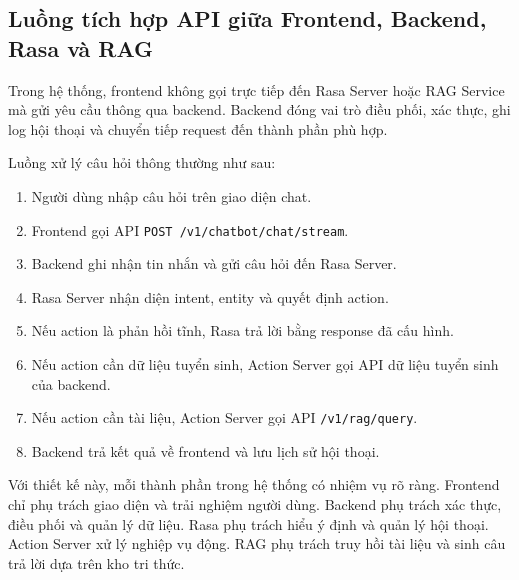 \subsection{Luồng tích hợp API giữa Frontend, Backend, Rasa và RAG}

Trong hệ thống, frontend không gọi trực tiếp đến Rasa Server hoặc RAG Service mà gửi yêu cầu thông qua backend. Backend đóng vai trò điều phối, xác thực, ghi log hội thoại và chuyển tiếp request đến thành phần phù hợp.

Luồng xử lý câu hỏi thông thường như sau:

\begin{enumerate}
    \item Người dùng nhập câu hỏi trên giao diện chat.
    \item Frontend gọi API \texttt{POST /v1/chatbot/chat/stream}.
    \item Backend ghi nhận tin nhắn và gửi câu hỏi đến Rasa Server.
    \item Rasa Server nhận diện intent, entity và quyết định action.
    \item Nếu action là phản hồi tĩnh, Rasa trả lời bằng response đã cấu hình.
    \item Nếu action cần dữ liệu tuyển sinh, Action Server gọi API dữ liệu tuyển sinh của backend.
    \item Nếu action cần tài liệu, Action Server gọi API \texttt{/v1/rag/query}.
    \item Backend trả kết quả về frontend và lưu lịch sử hội thoại.
\end{enumerate}

Với thiết kế này, mỗi thành phần trong hệ thống có nhiệm vụ rõ ràng. Frontend chỉ phụ trách giao diện và trải nghiệm người dùng. Backend phụ trách xác thực, điều phối và quản lý dữ liệu. Rasa phụ trách hiểu ý định và quản lý hội thoại. Action Server xử lý nghiệp vụ động. RAG phụ trách truy hồi tài liệu và sinh câu trả lời dựa trên kho tri thức.
